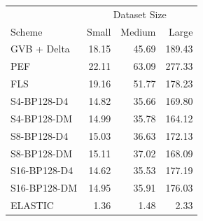 \begin{tabular}{lrrr}
\toprule
 & \multicolumn{3}{c}{Dataset Size} \\
Scheme & Small & Medium & Large \\
\midrule
GVB + Delta & 18.15 & 45.69 & 189.43 \\
PEF & 22.11 & 63.09 & 277.33 \\
FLS & 19.16 & 51.77 & 178.23 \\
S4-BP128-D4 & 14.82 & 35.66 & 169.80 \\
S4-BP128-DM & 14.99 & 35.78 & 164.12 \\
S8-BP128-D4 & 15.03 & 36.63 & 172.13 \\
S8-BP128-DM & 15.11 & 37.02 & 168.09 \\
S16-BP128-D4 & 14.62 & 35.53 & 177.19 \\
S16-BP128-DM & 14.95 & 35.91 & 176.03 \\
ELASTIC & 1.36 & 1.48 & 2.33 \\
\bottomrule
\end{tabular}
